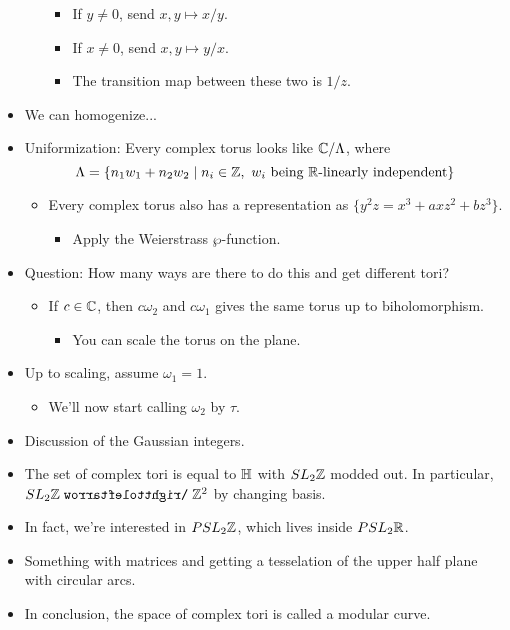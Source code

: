 \documentclass[../notes.tex]{subfiles}
\begin{document}
\begin{itemize}
\begin{itemize}
        \begin{itemize}
            \item If $y\neq 0$, send $x,y\mapsto x/y$.
            \item If $x\neq 0$, send $x,y\mapsto y/x$.
            \item The transition map between these two is $1/z$.
        \end{itemize}
    \end{itemize}
    \item We can homogenize...
    \item Uniformization: Every complex torus looks like $\mathbb{C}/\Lambda$, where
    \begin{equation*}
        \Lambda = \{n_1w_1+n_2w_2\mid n_i\in\Z,\ w_i\text{ being }\R\text{-linearly independent}\}
    \end{equation*}
    \begin{itemize}
        \item Every complex torus also has a representation as $\{y^2z=x^3+axz^2+bz^3\}$.
        \begin{itemize}
            \item Apply the Weierstrass $\wp$-function.
        \end{itemize}
    \end{itemize}
    \item Question: How many ways are there to do this and get different tori?
    \begin{itemize}
        \item If $c\in\mathbb{C}$, then $c\omega_2$ and $c\omega_1$ gives the same torus up to biholomorphism.
        \begin{itemize}
            \item You can scale the torus on the plane.
        \end{itemize}
    \end{itemize}
    \item Up to scaling, assume $\omega_1=1$.
    \begin{itemize}
        \item We'll now start calling $\omega_2$ by $\tau$.
    \end{itemize}
    \item Discussion of the Gaussian integers.
    \item The set of complex tori is equal to $\mathbb{H}$ with $SL_2\mathbb{Z}$ modded out. In particular, $SL_2\Z\acts\Z^2$ by changing basis.
    \item In fact, we're interested in $PSL_2\mathbb{Z}$, which lives inside $PSL_2\mathbb{R}$.
    \item Something with matrices and getting a tesselation of the upper half plane with circular arcs.
    \item In conclusion, the space of complex tori is called a modular curve.
\end{itemize}
\end{document}
